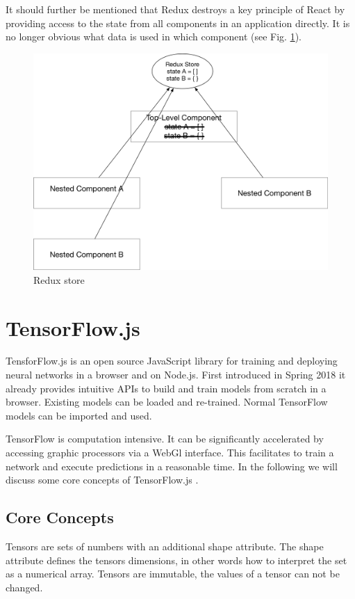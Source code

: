 It should further be mentioned that Redux destroys a key principle of React by 
providing access to the state from all components in an application directly. 
It is no longer obvious what data is used in which component (see Fig. \ref{fig:Redux}).
\begin{figure}[H]
	\centering
	\includegraphics[width=0.8\linewidth]{bilder/grundlagen/reduxStore.png}
	\caption{Redux store}
	\label{fig:Redux}
\end{figure}

\section{TensorFlow.js}
TensforFlow.js is an open source JavaScript library for training and deploying
neural networks in a browser and on Node.js. 
First introduced in Spring 2018 it already provides intuitive APIs to build and train models from scratch in a browser.
Existing models can be loaded and re-trained.
Normal TensorFlow models can be imported and used. 

TensorFlow is computation intensive.
It can be significantly accelerated by accessing graphic processors via a WebGl interface.
This facilitates to train a network and execute predictions in a reasonable time. 
In the following we will discuss some core concepts of TensorFlow.js \cite{TenosrFLowJs}. 

\subsection{Core Concepts}

Tensors are sets of numbers with an additional shape attribute.
The shape attribute defines the tensors dimensions, 
in other words how to interpret the set as a numerical array.
Tensors are immutable, the values of a tensor can not be changed. 


